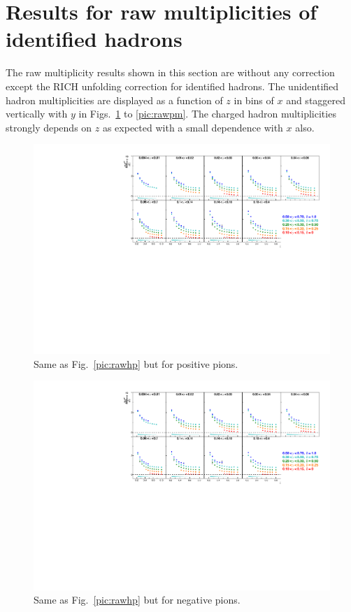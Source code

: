 
\section{Results for raw multiplicities of identified hadrons}

The raw multiplicity results shown in this section are without any correction except the RICH unfolding correction for identified hadrons. The unidentified hadron multiplicities are displayed as a function of $z$ in bins of $x$ and staggered vertically with $y$ in Figs.~\ref{pic:rawpip} to \ref{pic:rawpm}. The charged hadron multiplicities strongly depends on $z$ as expected with a small dependence with $x$ also.

\newpage

\begin{figure}[!h]
  \includegraphics[scale=0.85]{./gfx/rawpip.pdf}
  \caption{Same as Fig.~\ref{pic:rawhp} but for positive pions.}
  \label{pic:rawpip}
\end{figure}

\begin{figure}[!h]
  \includegraphics[scale=0.85]{./gfx/rawpim.pdf}
  \caption{Same as Fig.~\ref{pic:rawhp} but for negative pions.}
  \label{pic:rawpim}
\end{figure}

